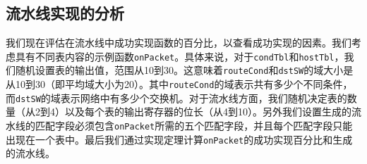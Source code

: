 \begin{table}[t]
\centering
{}

\vspace{2mm}
\caption{流水线的特征结果。}
\label{cap:tbl:table3}
\end{table}



\subsection{流水线实现的分析}

我们现在评估在流水线中成功实现函数的百分比，以查看成功实现的因素。我们考虑具有不同表内容的示例函数\texttt{onPacket}。具体来说，对于\texttt{condTbl}和\texttt{hostTbl}，我们随机设置表的输出值，范围从10到30。这意味着\texttt{routeCond}和\texttt{dstSW}的域大小是从10到30（即平均域大小为20）。其中\texttt{routeCond}的域表示共有多少个不同条件，而\texttt{dstSW}的域表示网络中有多少个交换机。对于流水线方面，我们随机决定表的数量（从2到4）以及每个表的输出寄存器的位长（从4到10）。另外我们设置生成的流水线的匹配字段必须包含\texttt{onPacket}所需的五个匹配字段，并且每个匹配字段只能出现在一个表中。最后我们通过实现定理计算\texttt{onPacket}的成功实现百分比和生成的流水线。



